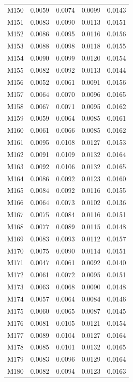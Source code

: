 \begin{longtable}{lrrrr}
M150 & 0.0059 & 0.0074 & 0.0099 & 0.0143 \\
M151 & 0.0083 & 0.0090 & 0.0113 & 0.0151 \\
M152 & 0.0086 & 0.0095 & 0.0116 & 0.0156 \\
M153 & 0.0088 & 0.0098 & 0.0118 & 0.0155 \\
M154 & 0.0090 & 0.0099 & 0.0120 & 0.0154 \\
M155 & 0.0082 & 0.0092 & 0.0113 & 0.0144 \\
M156 & 0.0052 & 0.0061 & 0.0091 & 0.0156 \\
M157 & 0.0064 & 0.0070 & 0.0096 & 0.0165 \\
M158 & 0.0067 & 0.0071 & 0.0095 & 0.0162 \\
M159 & 0.0059 & 0.0064 & 0.0085 & 0.0161 \\
M160 & 0.0061 & 0.0066 & 0.0085 & 0.0162 \\
M161 & 0.0095 & 0.0108 & 0.0127 & 0.0153 \\
M162 & 0.0091 & 0.0109 & 0.0132 & 0.0164 \\
M163 & 0.0092 & 0.0106 & 0.0132 & 0.0165 \\
M164 & 0.0086 & 0.0092 & 0.0123 & 0.0160 \\
M165 & 0.0084 & 0.0092 & 0.0116 & 0.0155 \\
M166 & 0.0064 & 0.0073 & 0.0102 & 0.0136 \\
M167 & 0.0075 & 0.0084 & 0.0116 & 0.0151 \\
M168 & 0.0077 & 0.0089 & 0.0115 & 0.0148 \\
M169 & 0.0083 & 0.0093 & 0.0112 & 0.0157 \\
M170 & 0.0075 & 0.0090 & 0.0114 & 0.0151 \\
M171 & 0.0047 & 0.0061 & 0.0092 & 0.0140 \\
M172 & 0.0061 & 0.0072 & 0.0095 & 0.0151 \\
M173 & 0.0063 & 0.0068 & 0.0090 & 0.0148 \\
M174 & 0.0057 & 0.0064 & 0.0084 & 0.0146 \\
M175 & 0.0060 & 0.0065 & 0.0087 & 0.0145 \\
M176 & 0.0081 & 0.0105 & 0.0121 & 0.0154 \\
M177 & 0.0089 & 0.0104 & 0.0127 & 0.0164 \\
M178 & 0.0085 & 0.0101 & 0.0132 & 0.0165 \\
M179 & 0.0083 & 0.0096 & 0.0129 & 0.0164 \\
M180 & 0.0082 & 0.0094 & 0.0123 & 0.0163 \\

\end{longtable}
